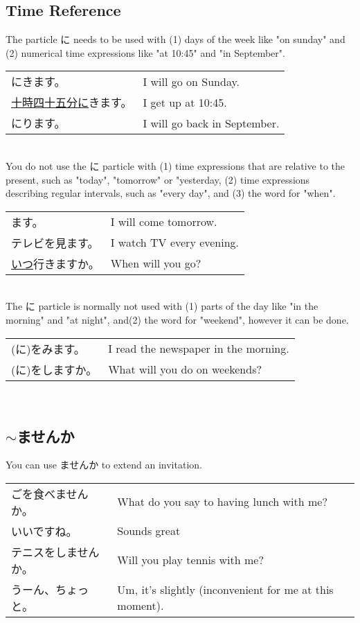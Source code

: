 \documentclass{article}
\newenvironment{gex}
{
	\,\\
	\renewcommand{\arraystretch}{1.5}
    \begin{tabular}{m{20em} l}
}
{
	\end{tabular}
	\renewcommand{\arraystretch}{1}
	\\
}
\begin{document}
   \subsection{Time Reference}
   The particle に needs to be used with (1) days of the week like "on sunday" and (2) numerical time expressions like "at 10:45" and "in September". 
   \begin{gex}
   	\underline{\ruby{日曜日}{にちようび}}に\ruby{行}{い}きます。 & I will go on Sunday. \\ 
   \underline{十時四十五分に\ruby{起}{お}}きます。& I get up at 10:45. \\
   \underline{\ruby{九}{く}\ruby{月}{がつ}}に\ruby{帰}{お}ります。 & I will go back in September.
   \end{gex}    
   You do not use the に particle with (1) time expressions that are relative to the present, such as "today", "tomorrow" or "yesterday, (2) time expressions describing regular intervals, such as "every day", and (3) the word for "when". 
   \begin{gex}
   \underline{\ruby{明日}{あした}}\ruby{来}{き}ます。 &  I will come tomorrow. \\
   \underline{\ruby{毎}{まい}}\ruby{晩}{ばん}テレビを見ます。 & I watch TV every evening. \\
   \underline{いつ}行きますか。 & When will you go?
   \end{gex}
   The に particle is normally not used with (1) parts of the day like "in the morning" and "at night", and(2) the word for "weekend", however it can be done. 
   \begin{gex}
   \underline{\ruby{朝}{あさ}}(に)\ruby{新聞}{しんぶん}を\ruby{読}{よ}みます。 & I read the newspaper in the morning. \\
   \underline{\ruby{週末}{しゅうまつ}}(に)\ruby{何}{なに}をしますか。 & What will you do on weekends? 
   \end{gex}
   
   
   \subsection{$\sim$ませんか}
   You can use ませんか to extend an invitation.
   \begin{gex}
   \ruby{昼}{ひる}ご\ruby{飯}{はん}を食べませんか。 & What do you say to having lunch with me? \\
   いいですね。 & Sounds great \\
   テニスをしませんか。 & Will you play tennis with me? \\
   うーん、ちょっと。 & Um, it's slightly (inconvenient for me at this moment).
   \end{gex}
   
\end{document}
